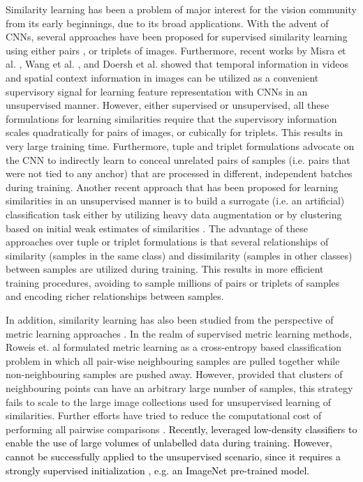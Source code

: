 \documentclass[10pt,twocolumn,letterpaper]{article}
\begin{document}
Similarity learning has been a problem of major interest for the vision community from its early beginnings, due to its broad applications. With the advent of CNNs, several approaches have been proposed for supervised similarity learning using either pairs \cite{ConvNetSimPatch}, or triplets \cite{ConvNetSimTriplet} of images. Furthermore, recent works by Misra et al. \cite{shuffleandlearn}, Wang et al. \cite{ConvNetpretext2}, and Doersh et al. \cite{ConvNetpretext1} showed that temporal information in videos and spatial context information in images can be utilized as a convenient supervisory signal for learning feature representation with CNNs in an unsupervised manner. However, either supervised or unsupervised, all these formulations for learning similarities require that the supervisory information scales quadratically for pairs of images, or cubically for triplets. This results in very large training time. Furthermore, tuple and triplet formulations advocate on the CNN to indirectly learn to conceal unrelated pairs of samples (i.e. pairs that were not tied to any anchor) that are processed in different, independent batches during training. Another recent approach that has been proposed for learning similarities in an unsupervised manner is to build a surrogate (i.e. an artificial) classification task either by utilizing heavy data augmentation \cite{exemplarcnn} or by clustering based on initial weak estimates of similarities \cite{cliquecnn,pseudolabel}. The advantage of these approaches over tuple or triplet formulations is that several relationships of similarity (samples in the same class) and dissimilarity (samples in other classes) between samples are utilized during training. This results in more efficient training procedures, avoiding to sample millions of pairs or triplets of samples and encoding richer relationships between samples.

In addition, similarity learning has also been studied from the perspective of metric learning approaches \cite{wsabie,nca,magnet}. In the realm of supervised metric learning methods, Roweis et. al \cite{nca} formulated metric learning as a cross-entropy based classification problem in which all pair-wise neighbouring samples are pulled together while non-neighbouring samples are pushed away. However, provided that clusters of neighbouring points can have an arbitrary large number of samples, this strategy fails to scale to the large image collections used for unsupervised learning of similarities. Further efforts \cite{nca_ext1,nca_ext2} have tried to reduce the computational cost of performing all pairwise comparisons \cite{nmc}. \textcolor{black}{Recently, \cite{lowdensity} leveraged low-density classifiers to enable the use of large volumes of unlabelled data during training. However, \cite{lowdensity} cannot be successfully applied to the unsupervised scenario, since it requires a strongly supervised initialization , e.g. an ImageNet pre-trained model.}
\end{document}
